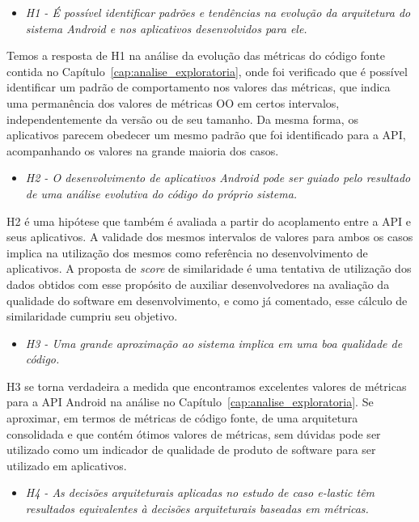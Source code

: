 \begin{itemize}
\item \textit{H1 - É possível identificar padrões e tendências na evolução da arquitetura do sistema Android e nos aplicativos desenvolvidos para ele.}
\end{itemize}

Temos a resposta de H1 na análise da evolução das métricas do código fonte contida no Capítulo~\ref{cap:analise_exploratoria}, onde foi verificado que é possível identificar um padrão de comportamento nos valores das métricas, que indica uma permanência dos valores de métricas OO em certos intervalos, independentemente da versão ou de seu tamanho. Da mesma forma, os aplicativos parecem obedecer um mesmo padrão que foi identificado para a API, acompanhando os valores na grande maioria dos casos.

\begin{itemize}
\item \textit{H2 - O desenvolvimento de aplicativos Android pode ser guiado pelo resultado de uma análise evolutiva do código do próprio sistema.}
\end{itemize}

H2 é uma hipótese que também é avaliada a partir do acoplamento entre a API e seus aplicativos. A validade dos mesmos intervalos de valores para ambos os casos implica na utilização dos mesmos como referência no desenvolvimento de aplicativos. A proposta de \textit{score} de similaridade é uma tentativa de utilização dos dados obtidos com esse propósito de auxiliar desenvolvedores na avaliação da qualidade do software em desenvolvimento, e como já comentado, esse cálculo de similaridade cumpriu seu objetivo.

\begin{itemize}
\item \textit{H3 - Uma grande aproximação ao sistema implica em uma boa qualidade de código.}
\end{itemize}

H3 se torna verdadeira a medida que encontramos excelentes valores de métricas para a API Android na análise no Capítulo~\ref{cap:analise_exploratoria}. Se aproximar, em termos de métricas de código fonte, de uma arquitetura consolidada e que contém ótimos valores de métricas, sem dúvidas pode ser utilizado como um indicador de qualidade de produto de software para ser utilizado em aplicativos.

\begin{itemize}
\item \textit{H4 - As decisões arquiteturais aplicadas no estudo de caso e-lastic têm resultados equivalentes à decisões arquiteturais baseadas em métricas.}
\end{itemize}

